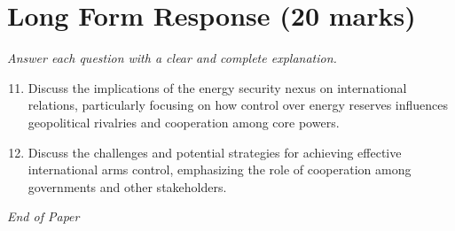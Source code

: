 \documentclass[12pt]{article}
\begin{document}
\section*{Long Form Response (20 marks)}
\textit{Answer each question with a clear and complete explanation.}
\begin{enumerate}[label=\arabic*.]
\setcounter{enumi}{10}
\item Discuss the implications of the energy security nexus on international relations, particularly focusing on how control over energy reserves influences geopolitical rivalries and cooperation among core powers.
\item Discuss the challenges and potential strategies for achieving effective international arms control, emphasizing the role of cooperation among governments and other stakeholders.
\end{enumerate}

\vfill
\noindent\textit{End of Paper}
\end{document}

